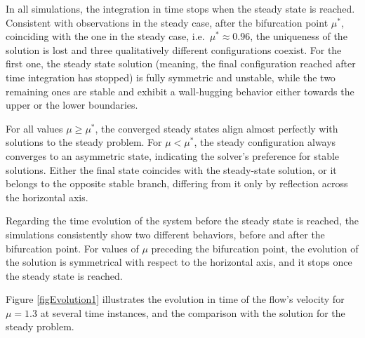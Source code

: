 \documentclass[reqno]{amsart}[standalone]
\theoremstyle{definition}
\theoremstyle{remark}
\begin{document}
In all simulations, the integration in time stops when the steady state is reached.
Consistent with observations in the steady case, after the bifurcation point $\mu^\ast$, coinciding with the one in the steady case, i.e.\ $\mu^\ast\approx 0.96$, the uniqueness of the solution is lost and three qualitatively different configurations coexist.
For the first one, the steady state solution (meaning, the final configuration reached after time integration has stopped) is fully symmetric and unstable, while the two remaining ones are stable and exhibit a wall-hugging behavior either towards the upper or the lower boundaries.

For all values $\mu\geq\mu^\ast$, the converged steady states align almost perfectly with solutions to the steady problem.
For $\mu<\mu^\ast$, the steady configuration always converges to an asymmetric state, indicating the solver's preference for stable solutions.
Either the final state coincides with the steady-state solution, or it belongs to the opposite stable branch, differing from it only by reflection across the horizontal axis.

Regarding the time evolution of the system before the steady state is reached, the simulations consistently show two different behaviors, before and after the bifurcation point.
For values of $\mu$ preceding the bifurcation point, the evolution of the solution is symmetrical with respect to the horizontal axis, and it stops once the steady state is reached.

Figure \ref{figEvolution1} illustrates the evolution in time of the flow's velocity for $\mu=1.3$ at several time instances, and the comparison with the solution for the steady problem.
\end{document}
